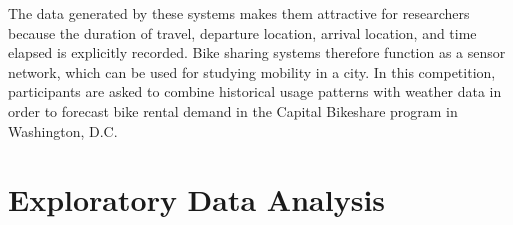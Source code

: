 The data generated by these systems makes them attractive for researchers
because the duration of travel, departure location, arrival location, 
and time elapsed is explicitly recorded. 
Bike sharing systems therefore function as a sensor network, 
which can be used for studying mobility in a city. 
In this competition, 
participants are asked to combine historical usage patterns with weather data in order to forecast bike rental demand in the Capital Bikeshare program in Washington, 
D.C.
















\section{Exploratory Data Analysis} \label{sec-preliminaries}

